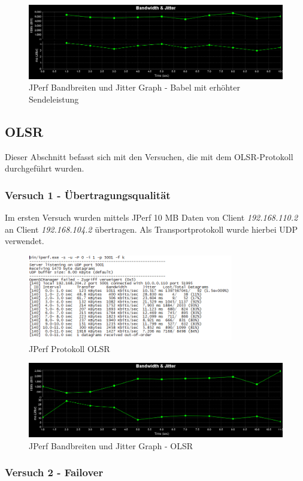 \documentclass[10pt]{scrartcl}
\begin{document}
\begin{figure}[htbp]
	\centering	\includegraphics[width=1.0\textwidth]{Grafiken/Babel_TX11_Grafik.png}
	\caption{JPerf Bandbreiten und Jitter Graph - Babel mit erhöhter Sendeleistung}
	\label{fig:JPerf_Babel_Graph_TX11}
\end{figure}

\subsection{OLSR}
Dieser Abschnitt befasst sich mit den Versuchen, die mit dem OLSR-Protokoll durchgeführt wurden.

\subsubsection{Versuch 1 - Übertragungsqualität}
Im ersten Versuch wurden mittels JPerf 10 MB Daten von Client \textit{192.168.110.2} an Client \textit{192.168.104.2} übertragen. Als Transportprotokoll wurde hierbei UDP verwendet.

\begin{figure}[htbp]
	\centering	\includegraphics[width=0.8\textwidth]{Grafiken/OLSR_TX1_Protokoll.png}
	\caption{JPerf Protokoll OLSR}
	\label{fig:JPerf_OLSR_Protokoll}
\end{figure} 

\begin{figure}[htbp]
	\centering	\includegraphics[width=1.0\textwidth]{Grafiken/OLSR_TX1_Grafik.png}
	\caption{JPerf Bandbreiten und Jitter Graph - OLSR}
	\label{fig:JPerf_OLSR_Graph}
\end{figure} 

\subsubsection{Versuch 2 - Failover}
\end{document}
